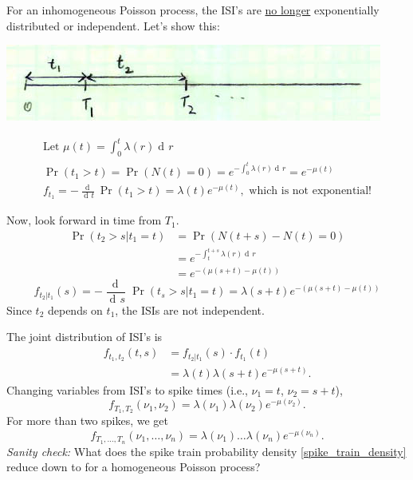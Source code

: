 \documentclass[11pt]{article}
\DeclareMathOperator{\dif}{d\!}
\begin{document}
For an inhomogeneous Poisson process, the ISI's are \underline{no longer} exponentially distributed or independent. Let's show this:

\begin{center}
\includegraphics[scale=0.5]{Figure11.jpg}
\end{center}

\begin{gather*}
\text{Let } \mu(t) = \int_0^t \lambda(r) \dif r \\
\Pr(t_1 > t) = \Pr\left(N(t) = 0\right) = e^{-\int_0^t \lambda(r) \dif r} = e^{-\mu(t)} \\
f_{t_1} = -\frac{\dif}{\dif t} \Pr(t_1 > t) = \lambda(t) e^{-\mu(t)}, \text{ which is not exponential!}
\end{gather*}

Now, look forward in time from $T_1$.
\begin{align*}
\Pr(t_2 > s \vert t_1=t) &= \Pr\left(N(t+s) - N(t) = 0\right) \\
 &= e^{-\int_t^{t+s} \lambda(r) \dif r} \\
 &= e^{-(\mu(s+t)  - \mu(t))}
\end{align*}
\begin{equation*}
f_{t_2 \vert t_1} (s) = -\frac{\dif}{\dif s} \Pr(t_s > s \vert t_1 = t) = \lambda(s + t) e^{-(\mu(s+t)  - \mu(t))}
\end{equation*}
Since $t_2$ depends on $t_1$, the ISIs are not independent. 

The joint distribution of ISI's is
\begin{align*}
f_{t_1,t_2}(t,s) &= f_{t_2 \vert t_1} (s) \cdot f_{t_1} (t) \\
 &= \lambda(t) \lambda(s + t) e^{-\mu(s+t)}.
\end{align*}
Changing variables from ISI's to spike times (i.e., $\nu_1 = t$, $\nu_2 = s + t$),
\begin{equation*}
f_{T_1,T_2}(\nu_1,\nu_2) = \lambda(\nu_1) \lambda(\nu_2) e^{-\mu(\nu_2)}.
\end{equation*}
For more than two spikes, we get
\begin{equation}
\label{spike_train_density}
\boxed{f_{T_1,\ldots,T_n}(\nu_1,\ldots,\nu_n) = \lambda(\nu_1) \ldots \lambda(\nu_n) e^{-\mu(\nu_n)}}.
\end{equation}
\emph{Sanity check:} What does the spike train probability density \ref{spike_train_density} reduce down to
for a homogeneous Poisson process?
\end{document}
